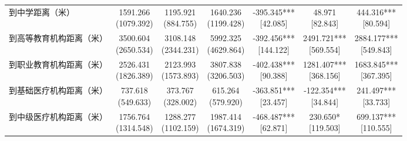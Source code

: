 \documentclass[a4paper,12pt]{report}
\begin{document}
\begin{table}[H]
\begin{adjustbox}{width=\textwidth,center}
\begin{tabular}{lcccccc}
到中学距离（米） & \makecell{1591.266\\(1079.392)} & \makecell{1195.921\\(884.755)} & \makecell{1640.236\\(1199.428)} & \makecell{-395.345***\\ {[42.085]}} & \makecell{48.971\\ {[82.843]}} & \makecell{444.316***\\ {[80.594]}} \\
到高等教育机构距离（米） & \makecell{3500.604\\(2650.534)} & \makecell{3108.148\\(2344.231)} & \makecell{5992.325\\(4629.864)} & \makecell{-392.456***\\ {[144.122]}} & \makecell{2491.721***\\ {[569.554]}} & \makecell{2884.177***\\ {[549.843]}} \\
到职业教育机构距离（米） & \makecell{2526.431\\(1826.389)} & \makecell{2123.993\\(1573.893)} & \makecell{3807.838\\(3206.503)} & \makecell{-402.438***\\ {[90.388]}} & \makecell{1281.407***\\ {[368.156]}} & \makecell{1683.845***\\ {[367.395]}} \\
到基础医疗机构距离（米） & \makecell{737.618\\(549.633)} & \makecell{373.767\\(328.002)} & \makecell{615.264\\(579.920)} & \makecell{-363.851***\\ {[23.457]}} & \makecell{-122.354***\\ {[34.844]}} & \makecell{241.497***\\ {[33.733]}} \\
到中级医疗机构距离（米） & \makecell{1756.764\\(1314.548)} & \makecell{1288.277\\(1102.159)} & \makecell{1987.414\\(1674.319)} & \makecell{-468.487***\\ {[62.871]}} & \makecell{230.650*\\ {[119.503]}} & \makecell{699.137***\\ {[110.555]}} \\

\end{tabular}
\end{adjustbox}
\end{table}
\end{document}
